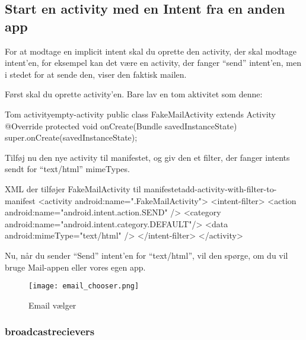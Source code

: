 \subsection{Start en activity med en Intent fra en anden app}

For at modtage en implicit intent skal du oprette den activity, der skal modtage intent'en, for eksempel kan det være en activity, der fanger ``send'' intent'en, men i stedet for at sende den, viser den faktisk mailen.

Først skal du oprette activity'en. Bare lav en tom aktivitet som denne:

\begin{example}\noindent
	\begin{JavaCode}{Tom activity}{empty-activity}
		public class FakeMailActivity extends Activity {
			@Override
			protected void onCreate(Bundle savedInstanceState) {
				super.onCreate(savedInstanceState);
			}
		}
	\end{JavaCode}
\end{example}

Tilføj nu den nye activity til manifestet, og giv den et filter, der fanger intents sendt for ``text/html'' mimeTypes.

\begin{example}\noindent
	\begin{XmlCode}{XML der tilføjer FakeMailActivity til manifestet}{add-activity-with-filter-to-manifest}
		<activity android:name=".FakeMailActivity">
			<intent-filter>
				<action android:name="android.intent.action.SEND" />
				<category android:name="android.intent.category.DEFAULT"/>
				<data android:mimeType="text/html" />
			</intent-filter>
		</activity>
	\end{XmlCode}
\end{example}

Nu, når du sender ``Send'' intent'en for ``text/html'', vil den spørge, om du vil bruge Mail-appen eller vores egen app.

\begin{figure}[H]
	\begin{center}
		\texttt{[image: email\_chooser.png]}
		\caption{Email vælger}
		\label{fig:android:activities:email_chooser}
	\end{center}
\end{figure}

\subsubsection{broadcastrecievers}

